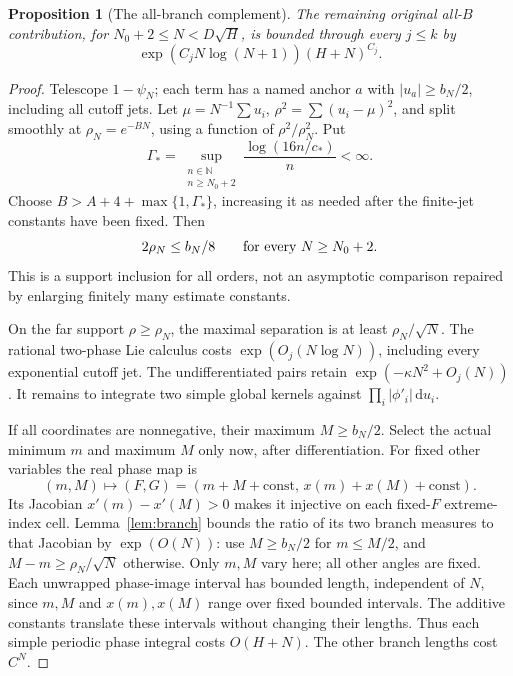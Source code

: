 \documentclass[11pt]{article}
\numberwithin{equation}{section}
\newtheorem{proposition}[theorem]{Proposition}
\theoremstyle{definition}
\newcommand{\dd}{\,\mathrm d}
\begin{document}
\begin{proposition}[The all-branch complement]\label{prop:allB}
The remaining original all-\(B\) contribution, for
\(N_0+2\le N<D\sqrt H\), is bounded through every \(j\le k\) by
\[
 \exp(C_jN\log(N+1))(H+N)^{C_j}.
\]
\end{proposition}
\begin{proof}
Telescope \(1-\psi_N\); each term has a named anchor \(a\) with
\(|u_a|\ge b_N/2\), including all cutoff jets.
Let \(\mu=N^{-1}\sum u_i\), \(\rho^2=\sum(u_i-\mu)^2\), and split
smoothly at \(\rho_N=e^{-BN}\), using a function of
\(\rho^2/\rho_N^2\). Put
\[
 \Gamma_* = \sup_{\substack{n\in\mathbb N\\n\ge N_0+2}}
                   \frac{\log(16n/c_*)}{n}<\infty.
\]
Choose \(B>A+4+\max\{1,\Gamma_*\}\), increasing it as needed
after the finite-jet constants have been fixed. Then
\[
 2\rho_N\le b_N/8\qquad\hbox{for every }N\ge N_0+2.
\]
This is a support inclusion for all orders, not an asymptotic
comparison repaired by enlarging finitely many estimate constants.

On the far support \(\rho\ge\rho_N\), the maximal separation
is at least \(\rho_N/\sqrt N\). The rational two-phase Lie
calculus costs \(\exp(O_j(N\log N))\), including every exponential
cutoff jet. The undifferentiated pairs retain
\(\exp(-\kappa N^2+O_j(N))\).
It remains to integrate two simple global kernels against
\(\prod_i|\phi'_i|\dd u_i\).

If all coordinates are nonnegative, their maximum \(M\ge b_N/2\).
Select the actual minimum \(m\) and maximum \(M\) only now,
after differentiation. For fixed other variables the real phase
map is
\[
 (m,M)\longmapsto(F,G)
    =(m+M+\mathrm{const},\,x(m)+x(M)+\mathrm{const}).
\]
Its Jacobian \(x'(m)-x'(M)>0\) makes it injective on each fixed-\(F\)
extreme-index cell. Lemma~\ref{lem:branch} bounds the ratio of its
two branch measures to that Jacobian by \(\exp(O(N))\):
use \(M\ge b_N/2\) for \(m\le M/2\), and
\(M-m\ge\rho_N/\sqrt N\) otherwise.
Only \(m,M\) vary here; all other angles are fixed. Each unwrapped
phase-image interval has bounded length, independent of \(N\), since
\(m,M\) and \(x(m),x(M)\) range over fixed bounded intervals.
The additive constants translate these intervals without changing
their lengths. Thus each simple periodic phase integral costs
\(O(H+N)\). The other branch lengths cost \(C^N\).


\end{proof}
\end{document}
